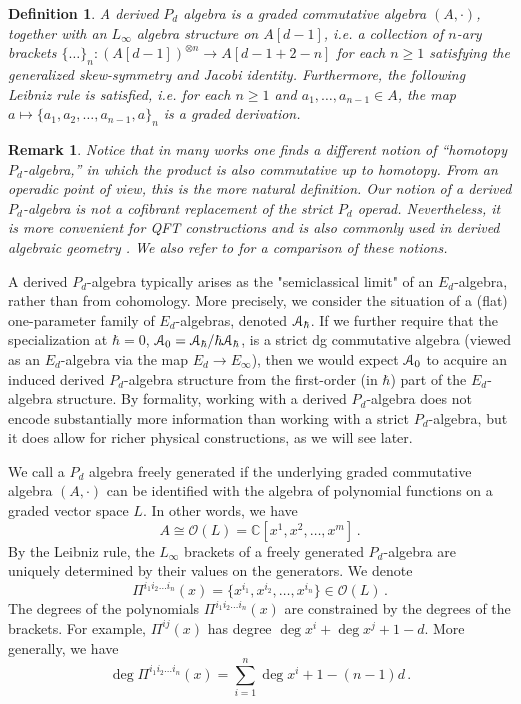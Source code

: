 \documentclass[11pt]{article}
\newcommand{\C}{\mathbb{C}}
\numberwithin{equation}{section}
\newtheorem{definition}{Definition}[section]
\newtheorem{remark}{Remark}[section]
\begin{document}
	\begin{definition}
	A derived $P_d$ algebra is a graded commutative algebra $(A,\cdot)$, together with an $L_\infty$ algebra structure on $A[d-1]$, i.e. a collection of $n$-ary brackets $\{\dots\}_n: (A[d-1])^{\otimes n} \to A[d-1+2-n]$ for each $n\geq 1$ satisfying the generalized skew-symmetry and Jacobi identity. Furthermore, the following Leibniz rule is satisfied, i.e. for each $n\geq 1$ and $a_1,\dots,a_{n-1} \in A$, the map $a \mapsto \{a_1,a_2,\dots,a_{n-1},a\}_n$ is a graded derivation. 
	\end{definition}
	
	
	\begin{remark}
	Notice that in many works one finds a different notion of “homotopy $P_d$-algebra,” in which the product is also commutative up to homotopy. From an operadic point of view, this is the more natural definition. Our notion of a derived $P_d$-algebra is not a cofibrant replacement of the strict $P_d$ operad. Nevertheless, it is more convenient for QFT constructions and is also commonly used in derived algebraic geometry \cite{calaque2017shifted,bandiera2020shifted}. We also refer to \cite{melani2016poisson} for a comparison of these notions.
	\end{remark}
	
	
A derived $P_d$-algebra typically arises as the "semiclassical limit" of an $E_d$-algebra, rather than from cohomology. More precisely, we consider the situation of a (flat) one-parameter family of $E_d$-algebras, denoted $\EuScript{A}_{\hbar}$. If we further require that the specialization at $\hbar=0$, $\EuScript{A}_{0} = \EuScript{A}_{\hbar}/\hbar\EuScript{A}_{\hbar}$, is a strict dg commutative algebra (viewed as an $E_d$-algebra via the map $E_d \to E_{\infty}$), then we would expect $\EuScript{A}_0$ to acquire an induced derived $P_d$-algebra structure from the first-order (in $\hbar$) part of the $E_d$-algebra structure. By formality, working with a derived $P_d$-algebra does not encode substantially more information than working with a strict $P_d$-algebra, but it does allow for richer physical constructions, as we will see later.
	
 	
	We call a $P_d$ algebra freely generated if the underlying graded commutative algebra $(A,\cdot)$ can be identified with the algebra of polynomial functions on a graded vector space $L$. In other words, we have
	\begin{equation}
		A \cong \mathcal{O}(L) = \C[x^1,x^2,\dots,x^m]\,.
	\end{equation}
By the Leibniz rule, the $L_\infty$ brackets of a freely generated $P_d$-algebra are uniquely determined by their values on the generators. We denote
	\begin{equation}
		\Pi^{i_1i_2\dots i_n}(x) = \{x^{i_1},x^{i_2},\dots,x^{i_n}\} \in \mathcal{O}(L)\,.
	\end{equation}
The degrees of the polynomials $\Pi^{i_1i_2\dots i_n}(x)$ are constrained by the degrees of the brackets. For example, $\Pi^{ij}(x)$ has degree $\deg x^i + \deg x^j + 1 - d$. More generally, we have	
	\begin{equation}
		\deg\Pi^{i_1i_2\dots i_n}(x) = \sum_{i = 1}^n \deg x^{i} + 1 - (n-1)d\,.
	\end{equation}
	
\end{document}
